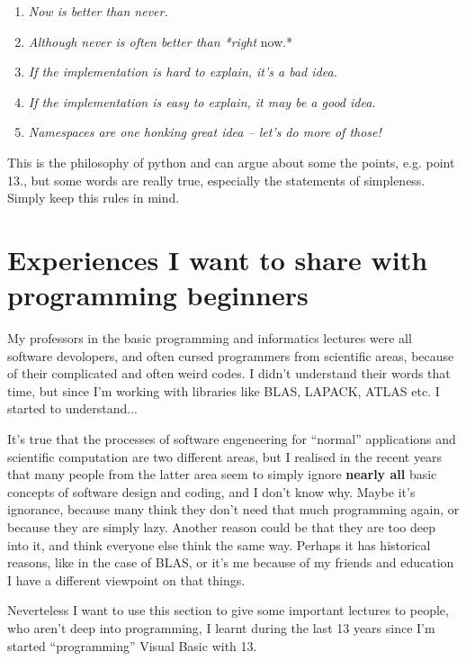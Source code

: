 \documentclass[letterpaper,10pt,english]{manual}
\begin{document}
\begin{enumerate}
\item {} 
\emph{Now is better than never.}

\item {} 
\emph{Although never is often better than *right} now.*

\item {} 
\emph{If the implementation is hard to explain, it's a bad idea.}

\item {} 
\emph{If the implementation is easy to explain, it may be a good idea.}

\item {} 
\emph{Namespaces are one honking great idea -- let's do more of those!}

\end{enumerate}

This is the philosophy of python and can argue about some the points, e.g. point 13., but some words are really true, especially the statements of simpleness.
Simply keep this rules in mind.


\section{Experiences I want to share with programming beginners}

My professors in the basic programming and informatics lectures were all software devolopers, and often cursed programmers from scientific areas,
because of their complicated and often weird codes. I didn't understand their words that time, but since I'm working with libraries like
BLAS, LAPACK, ATLAS etc. I started to understand...

It's true that the processes of software engeneering for ``normal'' applications and scientific computation are two different areas, but I realised in the recent
years that many people from the latter area seem to simply ignore \textbf{nearly all} basic concepts of software design and coding, and I don't know why.
Maybe it's ignorance, because many think they don't need that much programming again, or because they are simply lazy. Another reason could be
that they are too deep into it, and think everyone else think the same way. Perhaps it has historical reasons, like in the case of BLAS,
or it's me because of my friends and education I have a different viewpoint on  that things.

Neverteless I want to use this section to give some important lectures to people, who aren't deep into programming,
I learnt during the last 13 years since I'm started ``programming'' Visual Basic with 13.
\end{document}
